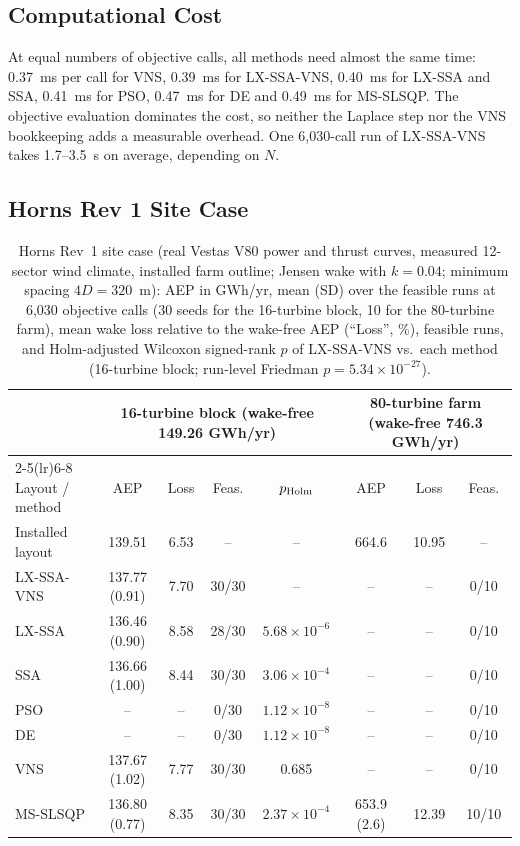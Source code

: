 \documentclass[journal,twoside]{IEEEtran}
\begin{document}
\subsection{Computational Cost}
\label{sec:runtime}
At equal numbers of objective calls, all methods need almost the same time: 0.37~ms per call for VNS, 0.39~ms for LX-SSA-VNS, 0.40~ms for LX-SSA and SSA, 0.41~ms for PSO, 0.47~ms for DE and 0.49~ms for MS-SLSQP. The objective evaluation dominates the cost, so neither the Laplace step nor the VNS bookkeeping adds a measurable overhead. One 6,030-call run of LX-SSA-VNS takes 1.7--3.5~s on average, depending on $N$.

\subsection{Horns Rev 1 Site Case}
\label{sec:hornsrev-site}
\begin{table}[!t]
\centering
\caption{Horns Rev~1 site case (real Vestas V80 power and thrust curves, measured 12-sector wind climate, installed farm outline; Jensen wake with $k=0.04$; minimum spacing $4D=320$~m): AEP in GWh/yr, mean (SD) over the feasible runs at 6,030 objective calls (30 seeds for the 16-turbine block, 10 for the 80-turbine farm), mean wake loss relative to the wake-free AEP (``Loss'', \%), feasible runs, and Holm-adjusted Wilcoxon signed-rank $p$ of LX-SSA-VNS vs.\ each method (16-turbine block; run-level Friedman $p=5.34\times10^{-27}$).}
\label{tab:hr-site}
\footnotesize\setlength{\tabcolsep}{4pt}
\begin{tabular}{lccccccc}
\toprule
& \multicolumn{4}{c}{16-turbine block (wake-free 149.26 GWh/yr)} & \multicolumn{3}{c}{80-turbine farm (wake-free 746.3 GWh/yr)} \\
\cmidrule(lr){2-5}\cmidrule(lr){6-8}
Layout / method & AEP & Loss & Feas. & $p_{\rm Holm}$ & AEP & Loss & Feas. \\
\midrule
Installed layout & 139.51 & 6.53 & -- & -- & 664.6 & 10.95 & -- \\
\midrule
LX-SSA-VNS & 137.77 (0.91) & 7.70 & 30/30 & -- & -- & -- & 0/10 \\
LX-SSA & 136.46 (0.90) & 8.58 & 28/30 & $5.68\times10^{-6}$ & -- & -- & 0/10 \\
SSA & 136.66 (1.00) & 8.44 & 30/30 & $3.06\times10^{-4}$ & -- & -- & 0/10 \\
PSO & -- & -- & 0/30 & $1.12\times10^{-8}$ & -- & -- & 0/10 \\
DE & -- & -- & 0/30 & $1.12\times10^{-8}$ & -- & -- & 0/10 \\
VNS & 137.67 (1.02) & 7.77 & 30/30 & 0.685 & -- & -- & 0/10 \\
MS-SLSQP & 136.80 (0.77) & 8.35 & 30/30 & $2.37\times10^{-4}$ & 653.9 (2.6) & 12.39 & 10/10 \\
\bottomrule
\end{tabular}
\end{table}
\end{document}
